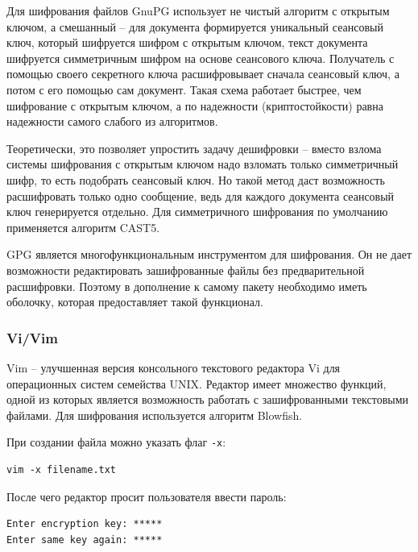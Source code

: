 Для шифрования файлов GnuPG использует не чистый алгоритм с открытым
ключом, а смешанный -- для документа формируется уникальный сеансовый ключ,
который шифруется шифром с открытым ключом, текст документа шифруется
симметричным шифром на основе сеансового ключа. Получатель с помощью своего
секретного ключа расшифровывает сначала сеансовый ключ, а потом с его помощью
сам документ. Такая схема работает быстрее, чем шифрование с открытым ключом,
а по надежности (криптостойкости) равна надежности самого слабого
из алгоритмов.

Теоретически, это позволяет упростить задачу дешифровки -- вместо взлома
системы шифрования с открытым ключом надо взломать только симметричный шифр,
то есть подобрать сеансовый ключ. Но такой метод даст возможность расшифровать
только одно сообщение, ведь для каждого документа сеансовый ключ генерируется
отдельно. Для симметричного шифрования по умолчанию применяется алгоритм CAST5.

GPG является многофункциональным инструментом для шифрования.
Он не дает возможности редактировать зашифрованные файлы без предварительной
расшифровки. Поэтому в дополнение к самому пакету необходимо иметь
оболочку, которая предоставляет такой функционал.

\subsubsection{Vi/Vim}


Vim -- улучшенная версия консольного текстового редактора Vi для
операционных систем семейства UNIX. Редактор имеет множество функций,
одной из которых является возможность работать с зашифрованными
текстовыми файлами. Для шифрования используется алгоритм Blowfish.

При создании файла можно указать флаг \texttt{-x}:

\begin{verbatim}
vim -x filename.txt
\end{verbatim}

После чего редактор просит пользователя ввести пароль:
\begin{verbatim}
Enter encryption key: *****
Enter same key again: *****
\end{verbatim}

